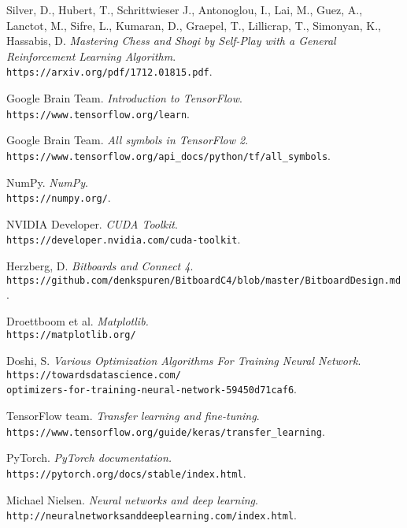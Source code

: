 \documentclass[12pt]{article}
\begin{document}
\begin{thebibliography}{9}

Silver, D., Hubert, T., Schrittwieser J., Antonoglou, I., Lai, M., Guez, A., Lanctot, M., Sifre, L., Kumaran, D., Graepel, T., Lillicrap, T., Simonyan, K., Hassabis, D.
\textit{Mastering Chess and Shogi by Self-Play with a General Reinforcement Learning Algorithm}.
\\\texttt{https://arxiv.org/pdf/1712.01815.pdf}.

Google Brain Team.
\textit{Introduction to TensorFlow}.
\\\texttt{https://www.tensorflow.org/learn}.

Google Brain Team.
\textit{All symbols in TensorFlow 2}.
\\\texttt{https://www.tensorflow.org/api\_docs/python/tf/all\_symbols}.

NumPy.
\textit{NumPy}.
\\\texttt{https://numpy.org/}.

NVIDIA Developer.
\textit{CUDA Toolkit}.
\\\texttt{https://developer.nvidia.com/cuda-toolkit}.

Herzberg, D.
\textit{Bitboards and Connect 4}.
\\\texttt{https://github.com/denkspuren/BitboardC4/blob/master/BitboardDesign.md}.

Droettboom et al.
\textit{Matplotlib.}
\\\texttt{https://matplotlib.org/}

Doshi, S.
\textit{Various Optimization Algorithms For Training Neural Network}.
\\\texttt{https://towardsdatascience.com/}
\\\texttt{optimizers-for-training-neural-network-59450d71caf6}.

TensorFlow team.
\textit{Transfer learning and fine-tuning}.
\\\texttt{https://www.tensorflow.org/guide/keras/transfer\_learning}.

PyTorch.
\textit{PyTorch documentation.}
\\\texttt{https://pytorch.org/docs/stable/index.html}.

Michael Nielsen.
\textit{Neural networks and deep learning}.
\\\texttt{http://neuralnetworksanddeeplearning.com/index.html}.

\end{thebibliography}
\end{document}
